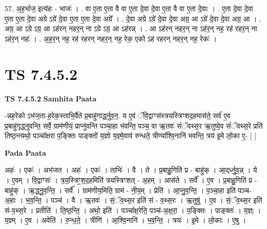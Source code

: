 \documentclass[17pt]{extarticle}
\begin{document}
57. अ॒ह॒र्भाज॒ इत्य॑हः - भाजः॑ । . वा ए॒ता ए॒ता वै वा ए॒ता दे॒वा दे॒वा ए॒ता वै वा ए॒ता दे॒वाः । . ए॒ता दे॒वा दे॒वा ए॒ता ए॒ता दे॒वा अग्रे ऽग्रे॑ दे॒वा ए॒ता ए॒ता दे॒वा अग्रे᳚ । . दे॒वा अग्रे ऽग्रे॑ दे॒वा दे॒वा अग्र॒ आ ऽग्रे॑ दे॒वा दे॒वा अग्र॒ आ । . अग्र॒ आ ऽग्रे ऽग्र॒ आ ऽह॑रन् नहर॒न् ना ऽग्रे ऽग्र॒ आ ऽह॑रन्न् । . आ ऽह॑रन् नहर॒न् ना ऽह॑र॒न् नह॒ रह॑ रहर॒न् ना ऽह॑र॒न् नहः॑ । . अ॒ह॒र॒न् नह॒ रह॑ रहरन् नहर॒न् नह॒ रेक॒ एको ऽह॑ रहरन् नहर॒न् नह॒ रेकः॑ । \newline
\pagebreak
{}

\section{ TS 7.4.5.2 }

\textbf{TS 7.4.5.2 } \newline
\textbf{Samhita Paata} \newline

-न्नह॒रेको ऽभ॑ज॒ता-ह॒रेक॒स्ताभि॒र्वैते प्र॒बाहु॑गार्द्ध्नुव॒न॒. य ए॒वं ॅवि॒द्वाꣳस॑स्त्रयस्त्रिꣳशद॒हमास॑ते॒ सर्व॑ ए॒व प्र॒बाहु॑गृद्ध्नुवन्ति॒ सर्वे॒ ग्राम॑णीयं॒ प्राप्नु॑वन्ति पञ्चा॒हा भ॑वन्ति॒ पञ्च॒ वा ऋ॒तवः॑ संॅवथ्स॒र ऋ॒तुष्वे॒व सं॑ॅवथ्स॒रे प्रति॑ तिष्ठ॒न्त्यथो॒ पञ्चा᳚क्षरा प॒ङ्क्तिः पाङ्क्तो॑ य॒ज्ञो य॒ज्ञ्मे॒वाव॑ रुन्धते॒ त्रीण्या᳚श्वि॒नानि॑ भवन्ति॒ त्रय॑ इ॒मे लो॒का ए॒- [  ] \newline

\textbf{Pada Paata} \newline

अहः॑ । एकः॑ । अभ॑जत । अहः॑ । एकः॑ । ताभिः॑ । वै । ते । प्र॒बाहु॒गिति॑ प्र - बाहु॑क् । आ॒द्‌र्ध्नु॒व॒न्न् । ये । ए॒वम् । वि॒द्वाꣳसः॑ । त्र॒य॒स्त्रिꣳ॒॒श॒द॒हमिति॑ त्रयस्त्रिꣳशत् - अ॒हम् । आस॑ते । सर्वे᳚ । ए॒व । प्र॒बाहु॒गिति॑ प्र - बाहु॑क् । ऋ॒द्ध्नु॒व॒न्ति॒ । सर्वे᳚ । ग्राम॑णीय॒मिति॒ ग्राम॑ - नी॒य॒म् । प्रेति॑ । आ॒प्नु॒व॒न्ति॒ । प॒ञ्चा॒हा इति॑ पञ्च-अ॒हाः । भ॒व॒न्ति॒ । पञ्च॑ । वै । ऋ॒तवः॑ । सं॒ॅव॒थ्स॒र इति॑ सं - व॒थ्स॒रः । ऋ॒तुषु॑ । ए॒व । सं॒ॅव॒थ्स॒र इति॑ सं-व॒थ्स॒रे । प्रतीति॑ । ति॒ष्ठ॒न्ति॒ । अथो॒ इति॑ । पञ्चा᳚क्ष॒रेति॒ पञ्च॑-अ॒क्ष॒रा॒ । प॒ङ्क्तिः । पाङ्क्तः॑ । य॒ज्ञ्ः । य॒ज्ञ्म् । ए॒व । अवेति॑ । रु॒न्ध॒ते॒ । त्रीणि॑ । आ॒श्वि॒नानि॑ । भ॒व॒न्ति॒ । त्रयः॑ । इ॒मे । लो॒काः । ए॒षु ।  \newline
\end{document}
